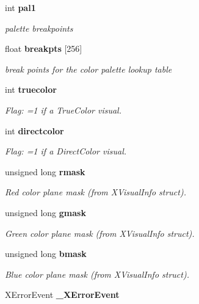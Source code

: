 \begin{CompactItemize}
\item 
int {\bf pal1}\label{xtvutils_8c_a44}

\begin{CompactList}\small\item\em palette breakpoints \item\end{CompactList}\item 
float {\bf breakpts} [256]\label{xtvutils_8c_a45}

\begin{CompactList}\small\item\em break points for the color palette lookup table \item\end{CompactList}\item 
int {\bf truecolor}\label{xtvutils_8c_a46}

\begin{CompactList}\small\item\em Flag: =1 if a True\-Color visual. \item\end{CompactList}\item 
int {\bf directcolor}\label{xtvutils_8c_a47}

\begin{CompactList}\small\item\em Flag: =1 if a Direct\-Color visual. \item\end{CompactList}\item 
unsigned long {\bf rmask}\label{xtvutils_8c_a48}

\begin{CompactList}\small\item\em Red color plane mask (from XVisual\-Info struct). \item\end{CompactList}\item 
unsigned long {\bf gmask}\label{xtvutils_8c_a49}

\begin{CompactList}\small\item\em Green color plane mask (from XVisual\-Info struct). \item\end{CompactList}\item 
unsigned long {\bf bmask}\label{xtvutils_8c_a50}

\begin{CompactList}\small\item\em Blue color plane mask (from XVisual\-Info struct). \item\end{CompactList}\item 
XError\-Event {\bf \_\-XError\-Event}\label{xtvutils_8c_a51}


\end{CompactItemize}
